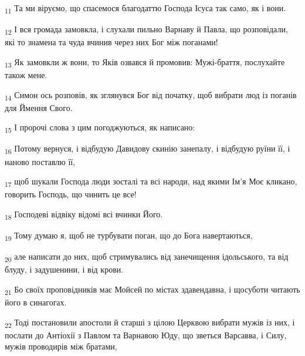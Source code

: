 \begin{tcolorbox}
\textsubscript{11} Та ми віруємо, що спасемося благодаттю Господа Ісуса так само, як і вони.
\end{tcolorbox}
\begin{tcolorbox}
\textsubscript{12} І вся громада замовкла, і слухали пильно Варнаву й Павла, що розповідали, які то знамена та чуда вчинив через них Бог між поганами!
\end{tcolorbox}
\begin{tcolorbox}
\textsubscript{13} Як замовкли ж вони, то Яків озвався й промовив: Мужі-браття, послухайте також мене.
\end{tcolorbox}
\begin{tcolorbox}
\textsubscript{14} Симон ось розповів, як зглянувся Бог від початку, щоб вибрати люд із поганів для Ймення Свого.
\end{tcolorbox}
\begin{tcolorbox}
\textsubscript{15} І пророчі слова з цим погоджуються, як написано:
\end{tcolorbox}
\begin{tcolorbox}
\textsubscript{16} Потому вернуся, і відбудую Давидову скинію занепалу, і відбудую руїни її, і наново поставлю її,
\end{tcolorbox}
\begin{tcolorbox}
\textsubscript{17} щоб шукали Господа люди зосталі та всі народи, над якими Ім'я Моє кликано, говорить Господь, що чинить це все!
\end{tcolorbox}
\begin{tcolorbox}
\textsubscript{18} Господеві відвіку відомі всі вчинки Його.
\end{tcolorbox}
\begin{tcolorbox}
\textsubscript{19} Тому думаю я, щоб не турбувати поган, що до Бога навертаються,
\end{tcolorbox}
\begin{tcolorbox}
\textsubscript{20} але написати до них, щоб стримувались від занечищення ідольського, та від блуду, і задушенини, і від крови.
\end{tcolorbox}
\begin{tcolorbox}
\textsubscript{21} Бо своїх проповідників має Мойсей по містах здавендавна, і щосуботи читають його в синагогах.
\end{tcolorbox}
\begin{tcolorbox}
\textsubscript{22} Тоді постановили апостоли й старші з цілою Церквою вибрати мужів із них, і послати до Антіохії з Павлом та Варнавою Юду, що зветься Варсавва, і Силу, мужів проводирів між братами,
\end{tcolorbox}
